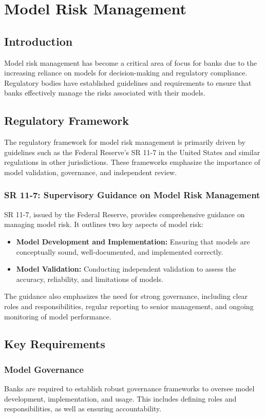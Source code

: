 \section{Model Risk Management}
\label{sec:modelrisk}

\subsection{Introduction}
Model risk management has become a critical area of focus for banks due to the increasing reliance on models for decision-making and regulatory compliance. Regulatory bodies have established guidelines and requirements to ensure that banks effectively manage the risks associated with their models.

\subsection{Regulatory Framework}
The regulatory framework for model risk management is primarily driven by guidelines such as the Federal Reserve's SR 11-7 in the United States and similar regulations in other jurisdictions. These frameworks emphasize the importance of model validation, governance, and independent review.

\subsubsection{SR 11-7: Supervisory Guidance on Model Risk Management}
SR 11-7, issued by the Federal Reserve, provides comprehensive guidance on managing model risk. It outlines two key aspects of model risk:
\begin{itemize}
    \item \textbf{Model Development and Implementation:} Ensuring that models are conceptually sound, well-documented, and implemented correctly.
    \item \textbf{Model Validation:} Conducting independent validation to assess the accuracy, reliability, and limitations of models.
\end{itemize}
The guidance also emphasizes the need for strong governance, including clear roles and responsibilities, regular reporting to senior management, and ongoing monitoring of model performance.

\subsection{Key Requirements}
\subsubsection{Model Governance}
Banks are required to establish robust governance frameworks to oversee model development, implementation, and usage. This includes defining roles and responsibilities, as well as ensuring accountability.

